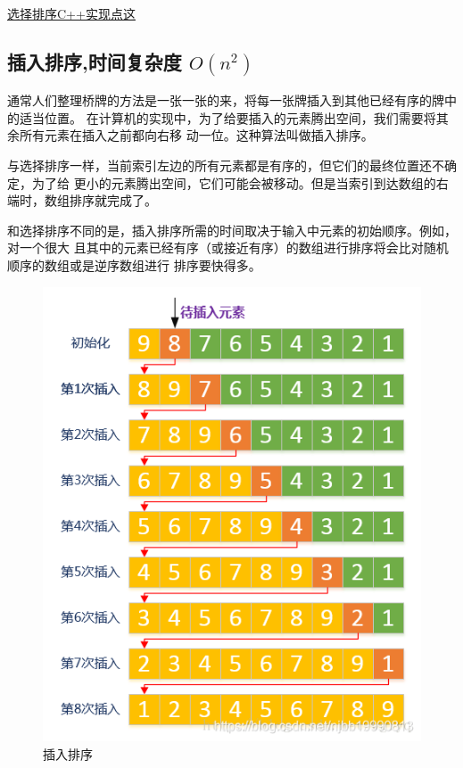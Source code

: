\documentclass[12pt,a4paper,onecolumn]{article}
\begin{document}
	\hyperref{https://github.com/la1993628/Algorithm_study/blob/master/%
	\subsection{插入排序,时间复杂度 $O(n^2)$}
	通常人们整理桥牌的方法是一张一张的来，将每一张牌插入到其他已经有序的牌中的适当位置。
	在计算机的实现中，为了给要插入的元素腾出空间，我们需要将其余所有元素在插入之前都向右移
	动一位。这种算法叫做插入排序。
	
	与选择排序一样，当前索引左边的所有元素都是有序的，但它们的最终位置还不确定，为了给
	更小的元素腾出空间，它们可能会被移动。但是当索引到达数组的右端时，数组排序就完成了。
	
	和选择排序不同的是，插入排序所需的时间取决于输入中元素的初始顺序。例如，对一个很大
	且其中的元素已经有序（或接近有序）的数组进行排序将会比对随机顺序的数组或是逆序数组进行
	排序要快得多。
	\begin{figure}[ht]
		\centering
		\includegraphics[width=0.7\linewidth]{img/insertSort}
		\caption{插入排序}
		\label{fig:insertsort}
	\end{figure}
	
\end{document}
